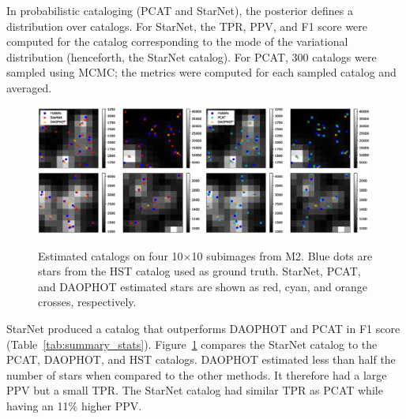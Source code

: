 In probabilistic cataloging (PCAT and StarNet), the posterior defines a distribution over catalogs.
For StarNet, the TPR, PPV, and F1 score were computed for the catalog corresponding to the mode of the variational distribution (henceforth, the StarNet catalog).
For PCAT, 300 catalogs were sampled using MCMC; the metrics were computed for each sampled catalog and averaged.

\begin{figure}[tb]
    \centering
    \includegraphics[width=0.49\textwidth]{figures_vg/m2_results/example_subimages_starnet.eps}
    \includegraphics[width=0.49\textwidth]{figures_vg/m2_results/example_subimages_pcat.eps}
    \caption{Estimated catalogs on four 10$\times$10 subimages from
    M2. Blue dots are stars from the HST catalog used as ground truth.
    StarNet, PCAT, and DAOPHOT estimated stars are shown as
    red, cyan, and orange crosses, respectively. }
    \label{fig:example_subimages}
\end{figure}

StarNet produced a catalog that outperforms DAOPHOT and PCAT in F1 score (Table~\ref{tab:summary_stats}).
Figure~\ref{fig:example_subimages} compares the StarNet catalog to the PCAT, DAOPHOT, and HST catalogs.
DAOPHOT estimated less than half the number of stars when compared to the other methods.
It therefore had a large PPV but a small TPR.
The StarNet catalog had similar TPR as PCAT while having an 11\% higher PPV.

